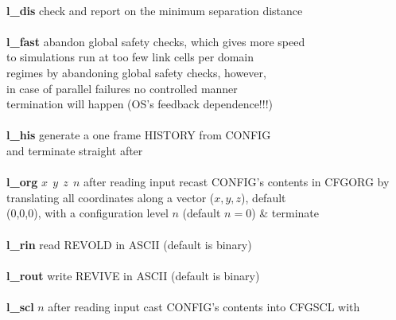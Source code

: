 \begin{tabbing}
\>                                              \> \\
\> {\bf l\_dis}                                 \> check and report on the minimum separation distance \\
\>                                              \> \\
\> {\bf l\_fast}                                \> abandon global safety checks, which gives more speed \\
\>                                              \> to simulations run at too few link cells per domain \\
\>                                              \> regimes by abandoning global safety checks, however, \\
\>                                              \> in case of parallel failures no controlled manner \\
\>                                              \> termination will happen (OS's feedback dependence!!!) \\
\>                                              \> \\
\> {\bf l\_his}                                 \> generate a one frame HISTORY from CONFIG \\
\>                                              \> and terminate straight after \\
\>                                              \> \\
\> {\bf l\_org} $x~~y~~z~~n$                    \> after reading input recast CONFIG's contents in CFGORG by \\
\>                                              \> translating all coordinates along a vector ($x,y,z$), default \\
\>                                              \> (0,0,0), with a configuration level $n$ (default $n=0$) \& terminate \\
\>                                              \> \\
\> {\bf l\_rin}                                 \> read REVOLD in ASCII (default is binary) \\
\>                                              \> \\
\> {\bf l\_rout}                                \> write REVIVE in ASCII (default is binary) \\
\>                                              \> \\
\> {\bf l\_scl} \phantom{xxx} $n$               \> after reading input cast CONFIG's contents into CFGSCL with \\

\end{tabbing}

